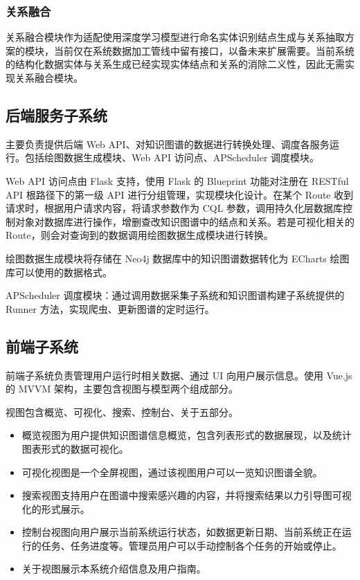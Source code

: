 \documentclass[a4paper,AutoFakeBold,oneside,12pt]{book}
\begin{document}
\subsubsection{关系融合}

关系融合模块作为适配使用深度学习模型进行命名实体识别结点生成与关系抽取方案的模块，当前仅在系统数据加工管线中留有接口，以备未来扩展需要。当前系统的结构化数据实体与关系生成已经实现实体结点和关系的消除二义性，因此无需实现关系融合模块。

\subsection{后端服务子系统}

主要负责提供后端 Web API、对知识图谱的数据进行转换处理、调度各服务运行。包括绘图数据生成模块、Web API 访问点、APScheduler 调度模块。

Web API 访问点由 Flask 支持，使用 Flask 的 Blueprint 功能对注册在 RESTful API 根路径下的第一级 API 进行分组管理，实现模块化设计。在某个 Route 收到请求时，根据用户请求内容，将请求参数作为 CQL 参数，调用持久化层数据库控制对象对数据库进行操作，增删查改知识图谱中的结点和关系。若是可视化相关的 Route，则会对查询到的数据调用绘图数据生成模块进行转换。

绘图数据生成模块将存储在 Neo4j 数据库中的知识图谱数据转化为 ECharts 绘图库可以使用的数据格式。

APScheduler 调度模块：通过调用数据采集子系统和知识图谱构建子系统提供的 Runner 方法，实现爬虫、更新图谱的定时运行。

\subsection{前端子系统}

前端子系统负责管理用户运行时相关数据、通过 UI 向用户展示信息。使用 Vue.js 的 MVVM 架构，主要包含视图与模型两个组成部分。

视图包含概览、可视化、搜索、控制台、关于五部分。

\begin{itemize}
	\item 概览视图为用户提供知识图谱信息概览，包含列表形式的数据展现，以及统计图表形式的数据可视化。
	\item 可视化视图是一个全屏视图，通过该视图用户可以一览知识图谱全貌。
	\item 搜索视图支持用户在图谱中搜索感兴趣的内容，并将搜索结果以力引导图可视化的形式展示。
	\item 控制台视图向用户展示当前系统运行状态，如数据更新日期、当前系统正在运行的任务、任务进度等。管理员用户可以手动控制各个任务的开始或停止。
	\item 关于视图展示本系统介绍信息及用户指南。
\end{itemize}
\end{document}
